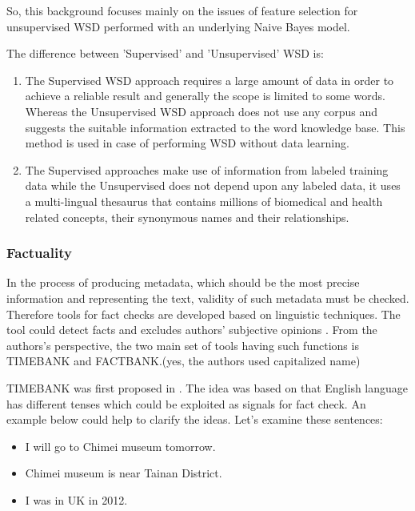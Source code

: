 So, this background focuses mainly on the issues of feature selection for unsupervised WSD performed with an underlying Naive Bayes model.

The difference between 'Supervised' and 'Unsupervised' WSD is:

\begin{enumerate}
	\item The Supervised WSD approach requires a large amount of data in order to achieve a reliable result and generally the scope is limited to some words. 
	Whereas the Unsupervised WSD approach does not use any corpus and suggests the suitable information extracted to the word knowledge base.
	This method is used in case of performing WSD without data learning.
	\item The Supervised approaches make use of information from labeled training data while the Unsupervised does not depend upon any labeled data, 
	it uses a multi-lingual thesaurus that contains millions of biomedical and health related concepts, their synonymous names and their relationships.
\end{enumerate}

\subsubsection*{Factuality}

In the process of producing metadata, which should be the most precise information and representing the text, validity of such metadata must be checked. 
Therefore tools for fact checks are developed based on linguistic techniques. 
The tool could detect facts and excludes authors' subjective opinions \cite{Agerri2014}. 
From the authors's perspective, the two main set of tools having such functions is TIMEBANK and FACTBANK.(yes, the authors used capitalized name)

TIMEBANK was first proposed in \cite{pustejovsky2003timebank}. 
The idea was based on that English language has different tenses which could be exploited as signals for fact check. 
An example below could help to clarify the ideas. Let's examine these sentences:

\begin{itemize}
	\item I will go to Chimei museum tomorrow.
	\item Chimei museum is near Tainan District.
	\item I was in UK in 2012.
\end{itemize}

